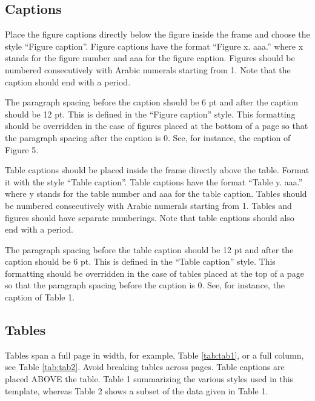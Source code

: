 \documentclass[10pt]{style_src/imeko_acta}
\begin{document}
\subsection{Captions}

Place the figure captions directly below the figure inside the frame and choose the style “Figure caption”. Figure captions have the format “Figure x. aaa.” where x stands for the figure number and aaa for the figure caption. Figures should be numbered consecutively with Arabic numerals starting from 1. Note that the caption should end with a period. 

The paragraph spacing before the caption should be 6 pt and after the caption should be 12 pt. This is defined in the “Figure caption” style. This formatting should be overridden in the case of figures placed at the bottom of a page so that the paragraph spacing after the caption is 0. See, for instance, the caption of Figure 5.

Table captions should be placed inside the frame directly above the table. Format it with the style “Table caption”. Table captions have the format “Table y. aaa.” where y stands for the table number and aaa for the table caption. Tables should be numbered consecutively with Arabic numerals starting from 1. Tables and figures should have separate numberings. Note that table captions should also end with a period. 

The paragraph spacing before the table caption should be 12 pt and after the caption should be 6 pt. This is defined in the “Table caption” style. This formatting should be overridden in the case of tables placed at the top of a page so that the paragraph spacing before the caption is 0. See, for instance, the caption of Table 1.


\subsection{Tables}

Tables span a full page in width, for example, Table \ref{tab:tab1}, or a full column, see Table \ref{tab:tab2}. Avoid breaking tables across pages.
Table captions are placed ABOVE the table. 
Table 1 summarizing the various styles used in this template, whereas Table 2 shows a subset of the data given in Table 1.
\end{document}

